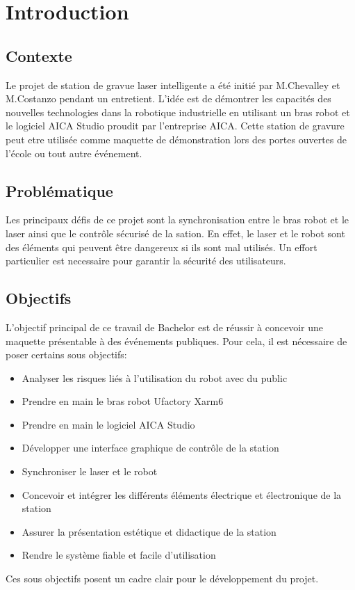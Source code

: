 \chapter{Introduction}

\section{Contexte}

Le projet de station de gravue laser intelligente a été initié par M.Chevalley et M.Costanzo pendant un entretient. L'idée est de démontrer les capacités des nouvelles technologies dans la robotique industrielle en utilisant un bras robot et le logiciel AICA Studio proudit par l'entreprise AICA. Cette station de gravure peut etre utilisée comme maquette de démonstration lors des portes ouvertes de l'école ou tout autre événement.

\section{Problématique}

Les principaux défis de ce projet sont la synchronisation entre le bras robot et le laser ainsi que le contrôle sécurisé de la sation. En effet, le laser et le robot sont des éléments qui peuvent être dangereux si ils sont mal utilisés. Un effort particulier est necessaire pour garantir la sécurité des utilisateurs.

\section{Objectifs}

L'objectif principal de ce travail de Bachelor est de réussir à concevoir une maquette présentable à des événements publiques. Pour cela, il est nécessaire de poser certains
sous objectifs:

\begin{itemize}
    \item Analyser les risques liés à l'utilisation du robot avec du public
    \item Prendre en main le bras robot Ufactory Xarm6
    \item Prendre en main le logiciel AICA Studio
    \item Développer une interface graphique de contrôle de la station
    \item Synchroniser le laser et le robot
    \item Concevoir et intégrer les différents éléments électrique et électronique de la station
    \item Assurer la présentation estétique et didactique de la station
    \item Rendre le système fiable et facile d'utilisation
\end{itemize}

Ces sous objectifs posent un cadre clair pour le développement du projet.


